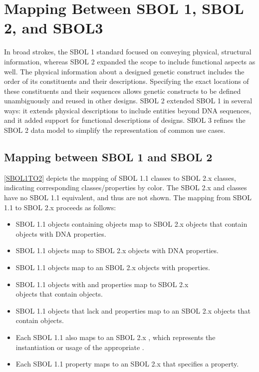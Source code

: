 \section{Mapping Between SBOL 1, SBOL 2, and SBOL3}
\label{sec:mapping}

In broad strokes, the SBOL 1 standard focused on conveying physical, structural information, whereas SBOL 2 expanded the scope to include functional aspects as well.  
The physical information about a designed genetic construct includes the order of its constituents and their descriptions. 
Specifying the exact locations of these constituents and their sequences allows genetic constructs to be defined unambiguously and reused in other designs. 
SBOL 2 extended SBOL 1 in several ways: it extends physical descriptions to include entities beyond DNA sequences, and it added support for functional descriptions of designs.  
SBOL 3 refines the SBOL 2 data model to simplify the representation of common use cases.

\subsection{Mapping between SBOL 1 and SBOL 2}

\ref{SBOL1TO2} depicts the mapping of SBOL 1.1 classes to SBOL 2.x classes, indicating corresponding classes/properties by color.
The SBOL 2.x  and  classes have no SBOL 1.1 equivalent, and thus are not shown.
The mapping from SBOL 1.1 to SBOL 2.x proceeds as follows:
\begin{itemize}
\item SBOL 1.1  objects containing  objects map to SBOL 2.x  objects that contain  objects with DNA  properties.
\item SBOL 1.1  objects map to SBOL 2.x  objects with DNA  properties.
\item SBOL 1.1  objects map to an SBOL 2.x  objects with   properties.
\item SBOL 1.1  objects with  and  properties map to SBOL 2.x\\
 objects that contain  objects.
\item SBOL 1.1  objects that lack  and  properties map to an SBOL 2.x  objects that contain  objects.
\item Each SBOL 1.1  also maps to an SBOL 2.x , which represents the instantiation or usage of the appropriate .
\item Each SBOL 1.1  property maps to an SBOL 2.x  that specifies a   property.
\end{itemize}

